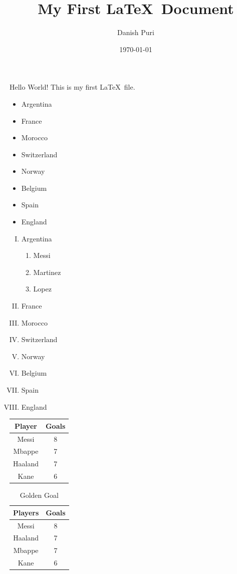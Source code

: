 \documentclass[11pt]{article}
\title{My First \LaTeX\ Document}
\author{Danish Puri}
\date {\today}
\begin{document}
\maketitle
    Hello World! This is my first \LaTeX\ file. 
\vspace{1cm}
\begin{itemize}
    \item Argentina 
    \item France 
    \item Morocco 
    \item Switzerland
    \item Norway
    \item Belgium 
    \item Spain 
    \item England
\end{itemize}
\vspace{1cm}

\begin{enumerate}[I.]
    \item Argentina 
    \begin{enumerate}
        \item [i] Messi 
        \item [ii] Martinez 
        \item [iii] Lopez 
    \end{enumerate}
    \item France 
    \item Morocco 
    \item Switzerland
    \item Norway
    \item Belgium 
    \item Spain 
    \item England
\end{enumerate}


\pagebreak
\begin{tabular}{|c|c|}
    \hline
    Player & Goals \\
    \hline \hline
    Messi & 8 \\
    Mbappe &7 \\
    Haaland & 7 \\
    Kane & 6 \\
    \hline 
\end{tabular}

\begin{table}[]
    \centering
    \begin{tabular}{|c|c|}
    \hline
        Players & Goals \\
        \hline
         Messi & 8 \\ 
         Haaland &7 \\
         Mbappe & 7 \\
         Kane &6\\
         \hline
    \end{tabular}
    \caption{Golden Goal }
    \label{tab:placeholder}
\end{table}
\end{document}
